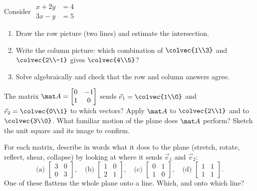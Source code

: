 \begin{exercise}
Consider $\begin{aligned} x + 2y &= 4 \\ 3x - y &= 5 \end{aligned}$
\begin{enumerate}
  \item Draw the row picture (two lines) and estimate the intersection.
  \item Write the column picture: which combination of $\colvec{1\\3}$ and $\colvec{2\\-1}$ gives
  $\colvec{4\\5}$?
  \item Solve algebraically and check that the row and column answers agree.
\end{enumerate}
\end{exercise}

\begin{exercise}
The matrix $\mat A = \begin{bmatrix} 0 & -1 \\ 1 & 0 \end{bmatrix}$ sends $\vec e_1=\colvec{1\\0}$ and
$\vec e_2=\colvec{0\\1}$ to which vectors? Apply $\mat A$ to $\colvec{2\\1}$ and to $\colvec{3\\0}$.
What familiar motion of the plane does $\mat A$ perform? Sketch the unit square and its image to
confirm.
\end{exercise}

\begin{exercise}
For each matrix, describe in words what it does to the plane (stretch, rotate, reflect, shear,
collapse) by looking at where it sends $\vec e_1$ and $\vec e_2$:
\[
\text{(a) } \begin{bmatrix} 3 & 0 \\ 0 & 3\end{bmatrix},\quad
\text{(b) } \begin{bmatrix} 1 & 0 \\ 2 & 1\end{bmatrix},\quad
\text{(c) } \begin{bmatrix} 0 & 1 \\ 1 & 0\end{bmatrix},\quad
\text{(d) } \begin{bmatrix} 1 & 1 \\ 1 & 1\end{bmatrix}.
\]
One of these flattens the whole plane onto a line. Which, and onto which line?
\end{exercise}

